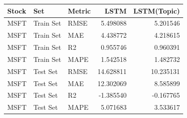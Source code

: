 \begin{tabular}{lllrr}
\toprule
Stock & Set & Metric & LSTM & LSTM(Topic) \\
\midrule
MSFT & Train Set & RMSE & 5.498088 & 5.201546 \\
MSFT & Train Set & MAE & 4.438772 & 4.218615 \\
MSFT & Train Set & R2 & 0.955746 & 0.960391 \\
MSFT & Train Set & MAPE & 1.542518 & 1.482732 \\
MSFT & Test Set & RMSE & 14.628811 & 10.235131 \\
MSFT & Test Set & MAE & 12.302069 & 8.585899 \\
MSFT & Test Set & R2 & -1.385540 & -0.167765 \\
MSFT & Test Set & MAPE & 5.071683 & 3.533617 \\
\bottomrule
\end{tabular}
